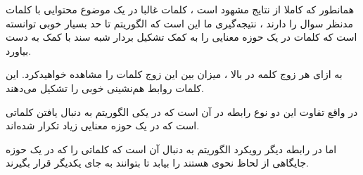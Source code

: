 \begin{boxA}
    همانطور که کاملا از نتایج مشهود است ، کلمات غالبا در یک موضوع محتوایی با کلمات مدنظر سوال را دارند ، نتیجه‌گیری ما این است که الگوریتم 
    تا حد بسیار خوبی توانسته است که کلمات در یک حوزه معنایی را به کمک تشکیل بردار شبه سند با کمک
    به دست بیاورد.

    به ازای هر زوج کلمه در بالا ، میزان
    بین این زوج کلمات را مشاهده خواهیدکرد.
    این کلمات روابط هم‌نشینی خوبی را تشکیل می‌دهند.

    در واقع تفاوت این دو نوع رابطه در آن است که در یکی الگوریتم به دنبال یافتن کلماتی است که در یک حوزه معنایی زیاد تکرار شده‌اند.

    اما در رابطه دیگر رویکرد الگوریتم به دنبال آن است که کلماتی را که در یک حوزه جایگاهی از لحاظ نحوی هستند را بیابد تا بتوانند به جای یکدیگر قرار بگیرند.
\end{boxA}